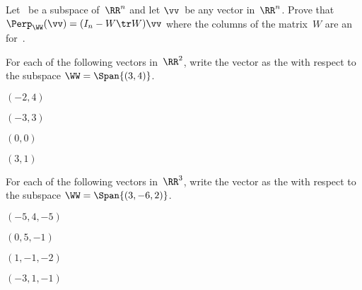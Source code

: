 \begin{exercise} \label{ex:perpn} 
Let \WW\ be a {subspace} of~\(\RR^n\) and let \(\vv\)~be any vector in~\(\RR^n\). 
Prove that \(\Perp_\WW(\vv)=(I_n-W\tr W)\vv\) where the columns of the matrix~\(W\) are an  for~\WW.
\end{exercise}




\begin{exercise}  
For each of the following vectors in~\(\RR^2\), write the vector as the  with respect to the subspace \(\WW=\Span\{(3,4)\}\).  
\begin{Parts}
\item \((-2,4)\)

\item \((-3,3)\)

\item \((0,0)\)

\item \((3,1)\)

\end{Parts}
\end{exercise}




\begin{exercise}  
For each of the following vectors in~\(\RR^3\), write the vector as the  with respect to the subspace \(\WW=\Span\{(3,-6,2)\}\).  
\begin{Parts}
\item \((-5,4,-5)\)

\item \((0,5,-1)\)

\item \((1,-1,-2)\)

\item \((-3,1,-1)\)

\end{Parts}
\end{exercise}





